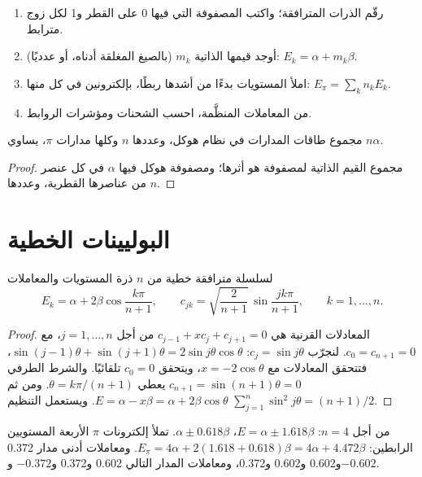 \begin{method}\label{met:b2:huckel:huckel}
\begin{enumerate}
  \item رقّم الذرات المترافقة؛ واكتب المصفوفة التي فيها 0 على القطر و1
        لكل زوج مترابط.
  \item أوجد قيمها الذاتية $m_k$ (بالصيغ المغلقة أدناه، أو عدديًا): $E_k =
        \alpha + m_k\beta$.
  \item املأ المستويات بدءًا من أشدها ربطًا، بإلكترونين في كل منها:
        $E_\pi = \sum_k n_k E_k$.
  \item من المعاملات المنظَّمة، احسب الشحنات ومؤشرات الروابط.
\end{enumerate}
\end{method}

\begin{proposition}[الأثر]\label{prop:b2:huckel:trace}
مجموع طاقات المدارات في نظام هوكل، وعددها $n$ وكلها مدارات $\pi$، يساوي $n\alpha$.
\end{proposition}

\begin{proof}
مجموع القيم الذاتية لمصفوفة هو أثرها؛ ومصفوفة هوكل فيها $\alpha$
في كل عنصر من عناصرها القطرية، وعددها $n$.
\end{proof}

\section{البوليينات الخطية}

\begin{theorem}\label{thm:b2:huckel:polyene}
لسلسلة مترافقة خطية من $n$ ذرة المستويات والمعاملات
\[
  E_k = \alpha + 2\beta\cos\frac{k\pi}{n + 1}, \qquad
  c_{jk} = \sqrt{\frac{2}{n + 1}}\,\sin\frac{jk\pi}{n + 1}, \qquad k = 1, \dots, n .
\]
\end{theorem}

\begin{proof}
المعادلات القرنية هي $c_{j-1} + xc_j + c_{j+1} = 0$ من أجل $j = 1, \dots, n$، مع
$c_0 = c_{n+1} = 0$. لنجرّب $c_j = \sin j\theta$: $\sin(j - 1)\theta + \sin(j + 1)\theta = 2\sin
j\theta\cos\theta$، فتتحقق المعادلات مع $x = -2\cos\theta$، ويتحقق $c_0 = 0$
تلقائيًا. والشرط الطرفي $c_{n+1} = \sin(n + 1)\theta = 0$ يعطي $\theta =
k\pi/(n + 1)$. ومن ثم $E = \alpha - x\beta = \alpha + 2\beta\cos\theta$. ويستعمل التنظيم
$\sum_{j=1}^n\sin^2 j\theta = (n + 1)/2$.
\end{proof}

\begin{example}[البوتاديين]\label{ex:b2:huckel:butadiene}
من أجل $n = 4$: $E = \alpha \pm 1.618\beta$، $\alpha \pm 0.618\beta$. تملأ إلكترونات $\pi$ الأربعة المستويين
الرابطين: $E_\pi = 4\alpha + 2(1.618 + 0.618)\beta = 4\alpha + 4.472\beta$. ومعاملات أدنى
مدار 0.372 و0.602 و0.602 و0.372، ومعاملات المدار التالي 0.602 و0.372 
و$-0.372$ و$-0.602$.
\end{example}

